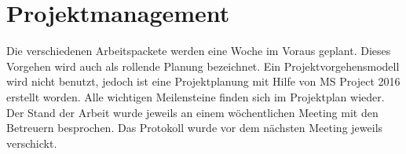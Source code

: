     \section{Projektmanagement}

      Die verschiedenen Arbeitspackete werden eine Woche im Voraus geplant.
      Dieses Vorgehen wird auch als rollende Planung bezeichnet.
      Ein Projektvorgehensmodell wird nicht benutzt, jedoch ist eine Projektplanung mit Hilfe von MS Project 2016
      erstellt worden. Alle wichtigen Meilensteine finden sich im Projektplan wieder.
      Der Stand der Arbeit wurde jeweils an einem wöchentlichen Meeting mit den Betreuern besprochen.
      Das Protokoll wurde vor dem nächsten Meeting jeweils verschickt.
